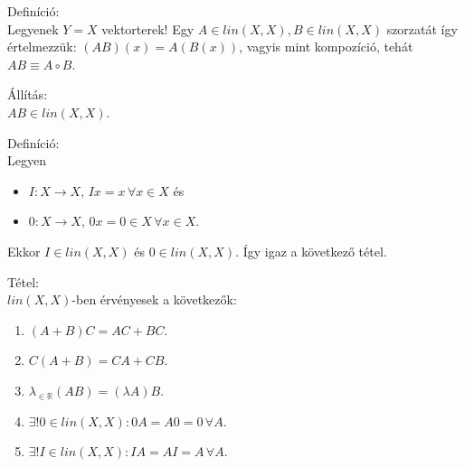 \documentclass[12pt,a4paper]{scrartcl}
\providecommand{\tightlist}{%
  \setlength{\itemsep}{0pt}\setlength{\parskip}{0pt}}
\newenvironment{definicio}{}{}
\newenvironment{tetel}{}{}
\newenvironment{allitas}{}{}
\begin{document}
\begin{definicio}

Definíció:\\
Legyenek \(Y = X\) vektorterek! Egy
\(A \in {lin}\left( {X,X} \right),B \in {lin}\left( {X,X} \right)\)
szorzatát így értelmezzük:
\(\left( {AB} \right)\left( x \right) = A\left( {B\left( x \right)} \right)\),
vagyis mint kompozíció, tehát \(AB \equiv A \circ B\).

\end{definicio}

\begin{allitas}

Állítás:\\
\(AB \in {lin}\left( {X,X} \right)\).

\end{allitas}

\begin{definicio}

Definíció:\\
Legyen

\begin{itemize}
\tightlist
\item
  \(\left. I:X\rightarrow X,\, Ix = x\,\forall x \in X \right.\) és
\item
  \(\left. 0:X\rightarrow X,\, 0x = 0 \in X\,\forall x \in X \right.\).
\end{itemize}

Ekkor \(I \in {lin}\left( {X,X} \right)\) és
\(0 \in {lin}\left( {X,X} \right)\). Így igaz a következő tétel.

\end{definicio}

\begin{tetel}

Tétel:\\
\({lin}\left( {X,X} \right)\)-ben érvényesek a következők:

\begin{enumerate}
\def\labelenumi{\arabic{enumi}.}
\tightlist
\item
  \(\left( {A + B} \right)C = AC + BC\).
\item
  \(C\left( {A + B} \right) = CA + CB\).
\item
  \(\lambda_{\in {\mathbb{R}}}\left( {AB} \right) = \left( {\lambda A} \right)B\).
\item
  \(\exists!0 \in {lin}\left( {X,X} \right):0A = A0 = 0\,\forall A\).
\item
  \(\exists!I \in {lin}\left( {X,X} \right):IA = AI = A\,\forall A\).
\end{enumerate}

\end{tetel}
\end{document}
